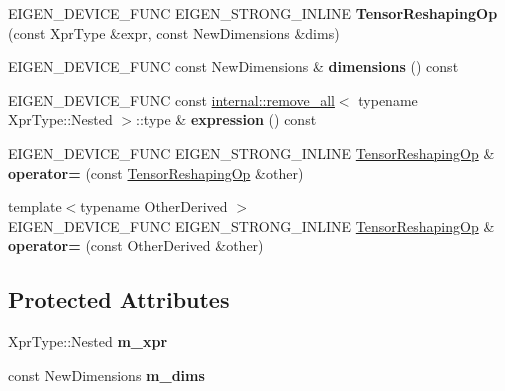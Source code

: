 \begin{DoxyCompactItemize}
E\+I\+G\+E\+N\+\_\+\+D\+E\+V\+I\+C\+E\+\_\+\+F\+U\+NC E\+I\+G\+E\+N\+\_\+\+S\+T\+R\+O\+N\+G\+\_\+\+I\+N\+L\+I\+NE {\bfseries Tensor\+Reshaping\+Op} (const Xpr\+Type \&expr, const New\+Dimensions \&dims)
\item 
\mbox{\label{class_eigen_1_1_tensor_reshaping_op_abb6c67d981c8e9d7fcfd205a739194ea}} 
E\+I\+G\+E\+N\+\_\+\+D\+E\+V\+I\+C\+E\+\_\+\+F\+U\+NC const New\+Dimensions \& {\bfseries dimensions} () const
\item 
\mbox{\label{class_eigen_1_1_tensor_reshaping_op_a4763364964a00cfc3e7944c5a18ca8d1}} 
E\+I\+G\+E\+N\+\_\+\+D\+E\+V\+I\+C\+E\+\_\+\+F\+U\+NC const \hyperlink{struct_eigen_1_1internal_1_1remove__all}{internal\+::remove\+\_\+all}$<$ typename Xpr\+Type\+::\+Nested $>$\+::type \& {\bfseries expression} () const
\item 
\mbox{\label{class_eigen_1_1_tensor_reshaping_op_a547537227250e333d19cec6890e12203}} 
E\+I\+G\+E\+N\+\_\+\+D\+E\+V\+I\+C\+E\+\_\+\+F\+U\+NC E\+I\+G\+E\+N\+\_\+\+S\+T\+R\+O\+N\+G\+\_\+\+I\+N\+L\+I\+NE \hyperlink{class_eigen_1_1_tensor_reshaping_op}{Tensor\+Reshaping\+Op} \& {\bfseries operator=} (const \hyperlink{class_eigen_1_1_tensor_reshaping_op}{Tensor\+Reshaping\+Op} \&other)
\item 
\mbox{\label{class_eigen_1_1_tensor_reshaping_op_a2de9e2546cf0437dafde7ec2442531a5}} 
{\footnotesize template$<$typename Other\+Derived $>$ }\\E\+I\+G\+E\+N\+\_\+\+D\+E\+V\+I\+C\+E\+\_\+\+F\+U\+NC E\+I\+G\+E\+N\+\_\+\+S\+T\+R\+O\+N\+G\+\_\+\+I\+N\+L\+I\+NE \hyperlink{class_eigen_1_1_tensor_reshaping_op}{Tensor\+Reshaping\+Op} \& {\bfseries operator=} (const Other\+Derived \&other)
\end{DoxyCompactItemize}
\subsection*{Protected Attributes}
\begin{DoxyCompactItemize}
\item 
\mbox{\label{class_eigen_1_1_tensor_reshaping_op_ad6cb5aaf84b3d436f622fce0252144f6}} 
Xpr\+Type\+::\+Nested {\bfseries m\+\_\+xpr}
\item 
\mbox{\label{class_eigen_1_1_tensor_reshaping_op_a68cd800d649927eec87a20940f30afc4}} 
const New\+Dimensions {\bfseries m\+\_\+dims}
\end{DoxyCompactItemize}
